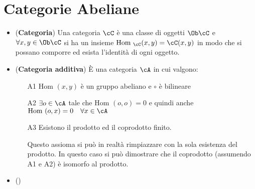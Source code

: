 \documentclass[a4paper,NoNotes,GeneralMath]{stdmdoc}
\newcommand{\Hom}{\text{Hom }}
\begin{document}
\section*{Categorie Abeliane}
\begin{itemize}
\item ({\bf Categoria}) Una categoria $\cC$ è una classe di oggetti
  $\Ob \cC$ e $\forall x, y \in \Ob \cC$ si ha un insieme
  $\Hom_\cC (x, y) = \cC(x, y)$ in modo che si possano comporre ed
  esista l'identità di ogni oggetto.
\item ({\bf Categoria additiva}) È una categoria $\cA$ in cui valgono:
  \begin{enumerate}
  \item[A1] $\Hom(x, y)$ è un gruppo abeliano e $\circ$ è bilineare
  \item[A2] $\exists o \in \cA$ tale che $\Hom (o, o) = 0$ e quindi
    anche $\Hom (o, x) = 0 \quad \forall x \in \cA$
  \item[A3] Esistono il prodotto ed il coprodotto finito.

    Questo assioma si può in realtà rimpiazzare con la sola esistenza
    del prodotto. In questo caso si può dimostrare che il coprodotto
    (assumendo A1 e A2) è isomorfo al prodotto.
  \end{enumerate}
\item ({\bf })
\end{itemize}
\end{document}
